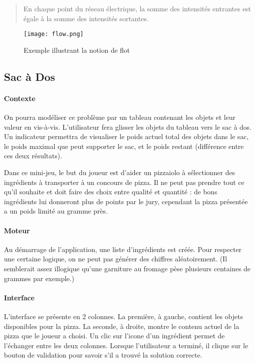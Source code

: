 \begin{quotation}
 	    En chaque point du réseau électrique, la somme des intensités entrantes est égale à la somme des intensités sortantes.

\end{quotation}
\begin{figure}[h]
\begin{center}
    \texttt{[image: flow.png]} 
    \caption{Exemple illustrant la notion de flot}

\end{center}
\end{figure}



    \subsection{Sac à Dos}
        \paragraph{Contexte}
        On pourra modéliser ce problème par un tableau contenant les objets et leur
        valeur en vis-à-vis. L'utilisateur fera glisser les objets du tableau vers
        le sac à dos. Un indicateur permettra de visualiser le poids actuel total
        des objets dans le sac, le poids maximal que peut supporter le sac, et le
        poids restant (différence entre ces deux résultats).

            Dans ce mini-jeu, le but du joueur est d'aider un pizzaiolo à
            sélectionner des ingrédients à transporter à un concours de pizza.
            Il ne peut pas prendre tout ce qu'il souhaite et doit faire des
            choix entre qualité et quantité : de bons ingrédients lui donneront
            plus de points par le jury, cependant la pizza présentée a un poids
            limité au gramme près.
        \paragraph{Moteur}
            Au démarrage de l'application, une liste d'ingrédients est créée.
            Pour respecter une certaine logique, on ne peut pas générer des
            chiffres aléatoirement. (Il semblerait assez illogique qu'une
            garniture au fromage pèse plusieurs centaines de grammes par
            exemple.)
        \paragraph{Interface}
            L'interface se présente en 2 colonnes. La première, à gauche,
            contient les objets disponibles pour la pizza. La seconde, à droite,
            montre le contenu actuel de la pizza que le joueur a choisi.
            Un clic sur l'icone d'un ingrédient permet de l'échanger entre
            les deux colonnes.
            Lorsque l'utilisateur a terminé, il clique sur le bouton de
            validation pour savoir s'il a trouvé la solution correcte.
